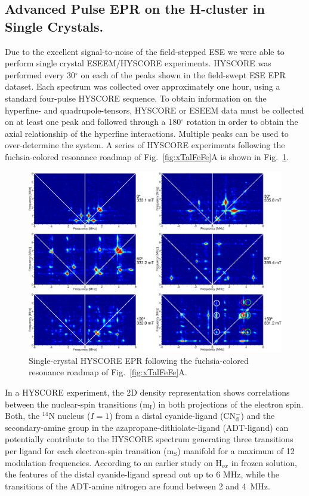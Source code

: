 \subsection{Advanced Pulse EPR on the H-cluster in Single Crystals.}
Due to the excellent signal-to-noise of the field-stepped ESE we were able to perform single crystal ESEEM/HYSCORE experiments. HYSCORE was performed every 30$^{\circ}$ on each of the peaks shown in the field-swept ESE EPR dataset. Each spectrum was collected over approximately one hour, using a standard four-pulse HYSCORE sequence. \cite{schweiger2001principles} To obtain information on the hyperfine- and quadrupole-tensors, HYSCORE or ESEEM data must be collected on at least one peak and followed through a 180$^{\circ}$ rotation in order to obtain the axial relationship of the hyperfine interactions. Multiple peaks can be used to over-determine the system. A series of HYSCORE experiments following the fuchsia-colored resonance roadmap of Fig.~\ref{fig:xTalFeFe}A is shown in Fig.~\ref{fig:FeFeHYSCOREFollow}. 

\begin{figure}[ht]
\centering
 \includegraphics[width=\textwidth]{Kapitel/Ch5-Images/FeFe-FollowHyscore.eps}
 \caption[Single-crystal HYSCORE EPR following a single peak.]{Single-crystal HYSCORE EPR following the fuchsia-colored resonance roadmap of Fig.~\ref{fig:xTalFeFe}A.} \label{fig:FeFeHYSCOREFollow}
\end{figure}

In a HYSCORE experiment, the 2D density representation shows correlations between the nuclear-spin transitions (m$_\text{I}$) in both projections of the electron spin. Both, the $^{14}$N nucleus ($I=1$) from a distal cyanide-ligand (CN$_\text{d}^-$) and the secondary-amine group in the azapropane-dithiolate-ligand (ADT-ligand) can potentially contribute to the HYSCORE spectrum generating three transitions per ligand for each electron-spin transition (m$_\text{S}$) manifold for a maximum of 12 modulation frequencies. According to an earlier study on H$_{ox}$ in frozen solution, the features of the distal cyanide-ligand spread out up to 6 MHz, while the transitions of the ADT-amine nitrogen are found between 2 and 4~MHz. \cite{Adamska2015,Adamska2015pdt}

